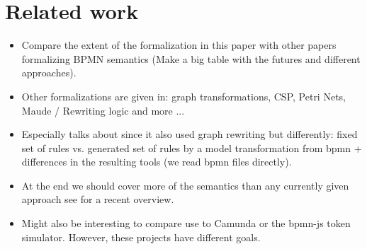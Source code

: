 \documentclass[adraft, copyright, creativecommons]{eptcs} %
\begin{document}
\section{Related work}
\begin{itemize}
    \item Compare the extent of the formalization in this paper with other papers formalizing BPMN semantics (Make a big table with the futures and different approaches).
    \item Other formalizations are given in: \cite{vangorpVisualTokenbasedFormalization2013} graph transformations, \cite{wongProcessSemanticsBPMN2008} CSP, \cite{dijkmanSemanticsAnalysisBusiness2008} Petri Nets, Maude / Rewriting logic \cite{corradiniFormalApproachAnalysis2021} and more ...
    \item Especially talks about \cite{vangorpVisualTokenbasedFormalization2013} since it also used graph rewriting but differently: fixed set of rules vs. generated set of rules by a model transformation from bpmn + differences in the resulting tools (we read bpmn files directly).
    \item At the end we should cover more of the semantics than any currently given approach see \cite{corradiniFormalApproachAnalysis2021} for a recent overview.
    \item Might also be interesting to compare use to Camunda or the bpmn-js token simulator. However, these projects have different goals.
\end{itemize}
\end{document}
